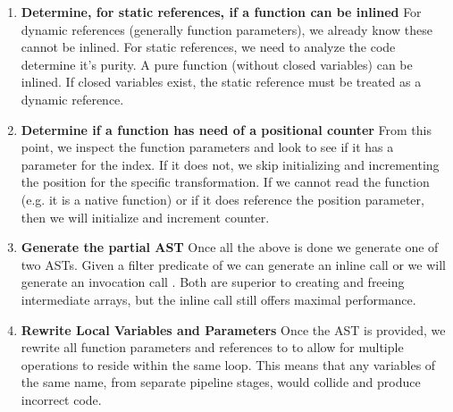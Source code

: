 \begin{enumerate}
  \item \textbf{Determine, for static references, if a function can be inlined}
    For dynamic references (generally  function parameters), we already know these cannot be inlined.  For static references, we need to analyze the code determine it's purity.  A pure function (without closed variables) can be inlined.  If closed variables exist, the static reference must be treated as a dynamic reference.
  \item \textbf{Determine if a function has need of a positional counter}
    From this point, we inspect the function parameters and look to see if it has a parameter for the index.  If it does not, we skip initializing and incrementing the position for the specific transformation.  If we cannot read the function (e.g. it is a native function) or if it does reference the position parameter, then we will initialize and increment counter.
  \item \textbf{Generate the partial AST}
    Once all the above is done we generate one of two ASTs. Given a filter predicate of  we can generate an inline call  or we will generate an invocation call .  Both are superior to creating and freeing intermediate arrays, but the inline call still offers maximal performance.
  \item \textbf{Rewrite Local Variables and Parameters}
    Once the AST is provided, we rewrite all function parameters and references to  to allow for multiple operations to reside within the same  loop.  This means that any variables of the same name, from separate pipeline stages, would collide and produce incorrect code.  
\end{enumerate}